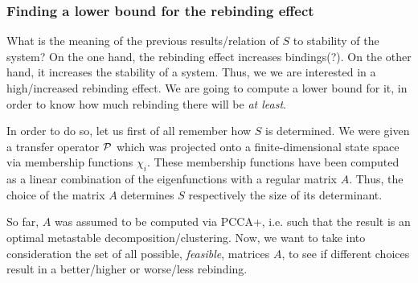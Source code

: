 

\subsubsection*{Finding a lower bound for the rebinding effect}

What is the meaning of the previous results/relation of $S$ to stability of the system?
On the one hand, the rebinding effect increases bindings(?). 
On the other hand, it increases the stability of a system. Thus, we we are interested in a high/increased rebinding effect.
We are going to compute a lower bound for it, in order to know
how much rebinding there will be \textit{at least}.

In order to do so, let us first of all remember how $S$ is determined. We were given a transfer operator $\mathcal{P}$ which was projected onto a finite-dimensional state space via membership functions $\chi_i$. These membership functions have been computed as a linear combination of the eigenfunctions with a regular matrix $A$. Thus, the choice of the matrix $A$ determines $S$ respectively the size of its determinant.

So far, $A$ was assumed to be computed via PCCA+, i.e. such that the result is an optimal metastable decomposition/clustering.
Now, we want to take into consideration the set of all possible, \textit{feasible}, matrices $A$, to see if different choices result in a better/higher or worse/less rebinding.

